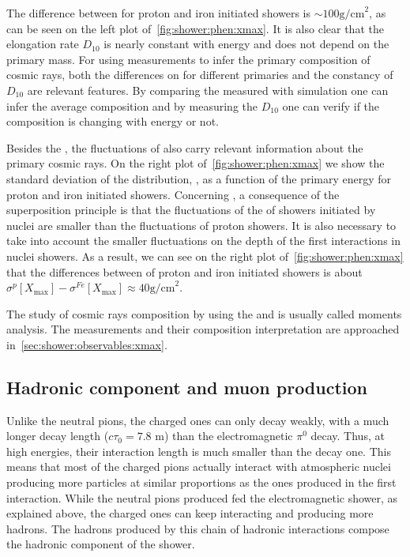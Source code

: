 The difference between \xmaxmean for
proton and iron initiated showers is $\sim 100 \text{g/cm}^2$, as can
be seen on the left plot of~\cref{fig:shower:phen:xmax}. It is also clear that the elongation rate
$D_{10}$ is nearly constant with energy and does not depend on the primary mass.
For using \xmax measurements to infer the primary composition of
cosmic rays, both the differences on \xmax for different primaries and
the constancy of $D_{10}$ are relevant features. By comparing the measured \xmaxmean
with simulation one can infer the average composition and by measuring
the $D_{10}$ one can verify if the composition is changing with energy or not. 


Besides the \xmaxmean, the fluctuations of \xmax also carry relevant information
about the primary cosmic rays. On the right plot of~\cref{fig:shower:phen:xmax}
we show the standard deviation of the \xmax distribution, \xmaxsig,
as a function of the primary energy for proton and iron initiated showers.
Concerning \xmaxsig, a consequence of the superposition principle
is that the fluctuations of the \xmax of showers initiated by nuclei
are smaller than the fluctuations of proton showers. It is also necessary
to take into account the smaller fluctuations on the depth of the first
interactions in nuclei showers. As a result,
we can see on the right plot of~\cref{fig:shower:phen:xmax}   
that the differences between \xmaxsig of proton and iron initiated showers is
about $\sigma^p[X_\text{max}]-\sigma^{Fe}[X_\text{max}] \approx 40 \text{g/cm}^2$.

The study of cosmic rays composition by using the \xmaxmean and \xmaxsig
is usually called \xmax moments analysis. The \xmax measurements
and their composition interpretation are approached in~\cref{sec:shower:observables:xmax}. 



\subsection{Hadronic component and muon production}
\label{sec:showers:phen:had}

Unlike the neutral pions, the charged ones can only decay weakly,
with a much longer decay length ($c\tau_0=7.8$ m)
than the electromagnetic $\pi^0$ decay.  
Thus, at high energies, their interaction length
is much smaller than the decay one. This means that most
of the charged pions actually interact with atmospheric nuclei
producing more particles at similar proportions as the ones produced
in the first interaction. While the neutral pions produced
fed the electromagnetic shower, as explained above, the charged ones
can keep interacting and producing more hadrons. The hadrons
produced by this chain of hadronic interactions compose the
hadronic component of the shower.

